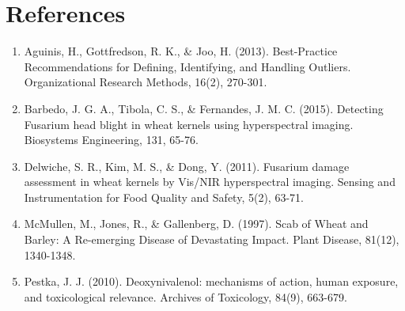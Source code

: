 \documentclass[12pt,a4paper]{article}
\begin{document}
\section{References}

\begin{enumerate}
    \item Aguinis, H., Gottfredson, R. K., \& Joo, H. (2013). Best-Practice Recommendations for Defining, Identifying, and Handling Outliers. Organizational Research Methods, 16(2), 270-301.
    
    \item Barbedo, J. G. A., Tibola, C. S., \& Fernandes, J. M. C. (2015). Detecting Fusarium head blight in wheat kernels using hyperspectral imaging. Biosystems Engineering, 131, 65-76.
    
    \item Delwiche, S. R., Kim, M. S., \& Dong, Y. (2011). Fusarium damage assessment in wheat kernels by Vis/NIR hyperspectral imaging. Sensing and Instrumentation for Food Quality and Safety, 5(2), 63-71.
    
    \item McMullen, M., Jones, R., \& Gallenberg, D. (1997). Scab of Wheat and Barley: A Re-emerging Disease of Devastating Impact. Plant Disease, 81(12), 1340-1348.
    
    \item Pestka, J. J. (2010). Deoxynivalenol: mechanisms of action, human exposure, and toxicological relevance. Archives of Toxicology, 84(9), 663-679.
\end{enumerate}
\end{document}
